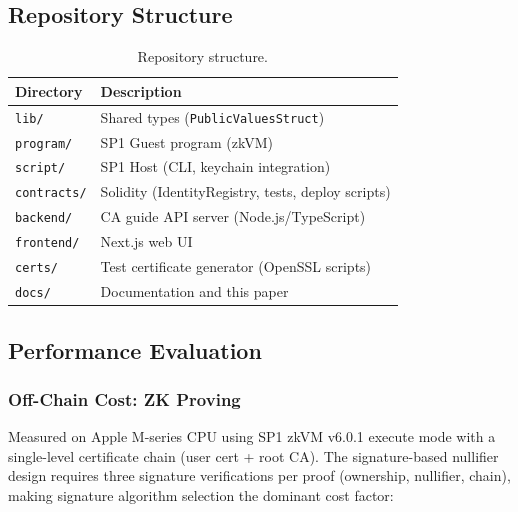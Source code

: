\documentclass[11pt, a4paper]{article}
\begin{document}
\subsection{Repository Structure}\label{repository-structure}

\begin{table}[ht]
\centering
\small
\caption{Repository structure.}
\label{tab:repo-structure}
\begin{tabular}{@{}ll@{}}
\toprule
Directory & Description \\
\midrule
\texttt{lib/} & Shared types (\texttt{PublicValuesStruct}) \\
\texttt{program/} & SP1 Guest program (zkVM) \\
\texttt{script/} & SP1 Host (CLI, keychain integration) \\
\texttt{contracts/} & Solidity (IdentityRegistry, tests, deploy scripts) \\
\texttt{backend/} & CA guide API server (Node.js/TypeScript) \\
\texttt{frontend/} & Next.js web UI \\
\texttt{certs/} & Test certificate generator (OpenSSL scripts) \\
\texttt{docs/} & Documentation and this paper \\
\bottomrule
\end{tabular}
\end{table}

\subsection{Performance Evaluation}\label{performance-evaluation}

\subsubsection{Off-Chain Cost: ZK
Proving}\label{off-chain-cost-zk-proving}

Measured on Apple M-series CPU using SP1 zkVM v6.0.1 execute mode with a
single-level certificate chain (user cert + root CA). The
signature-based nullifier design requires three signature verifications
per proof (ownership, nullifier, chain), making signature algorithm
selection the dominant cost factor:
\end{document}

